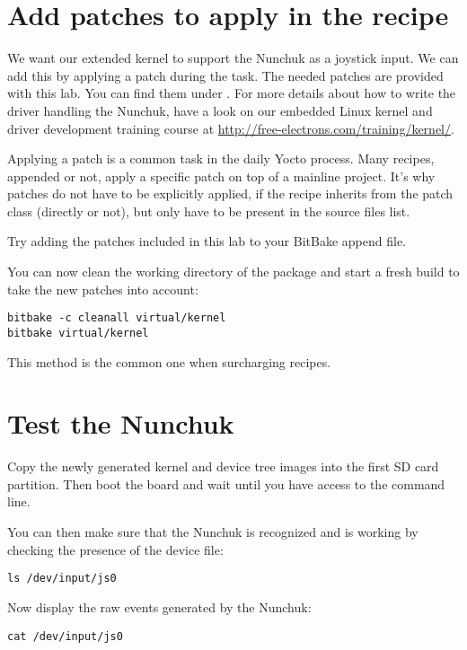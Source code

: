 \section{Add patches to apply in the recipe}

We want our extended  kernel to support the Nunchuk as
a joystick input. We can add this by applying a patch during the
 task. The needed patches are provided with this lab. You can
find them under . For more details about
how to write the driver handling the Nunchuk, have a look on our embedded Linux
kernel and driver development training course at
\url{http://free-electrons.com/training/kernel/}.

Applying a patch is a common task in the daily Yocto process. Many recipes,
appended or not, apply a specific patch on top of a mainline project. It's why
patches do not have to be explicitly applied, if the recipe inherits from the
patch class (directly or not), but only have to be present in the source files
list.

Try adding the patches included in this lab to your BitBake append file.

You can now clean the working directory of the  package
and start a fresh build to take the new patches into account:
\begin{verbatim}
bitbake -c cleanall virtual/kernel
bitbake virtual/kernel
\end{verbatim}

This method is the common one when surcharging recipes.

\section{Test the Nunchuk}

Copy the newly generated kernel and device tree images into the first SD card
partition. Then boot the board and wait until you have access to the
 command line.

You can then make sure that the Nunchuk is recognized and is working by
checking the presence of the  device file:
\begin{verbatim}
ls /dev/input/js0
\end{verbatim}

Now display the raw events generated by the Nunchuk:
\begin{verbatim}
cat /dev/input/js0
\end{verbatim}

